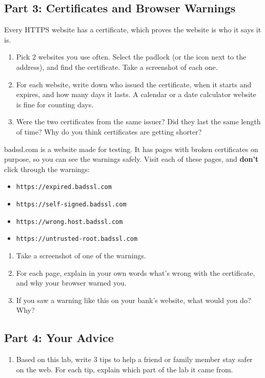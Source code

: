 \documentclass[12pt]{article}
\begin{document}
\subsection*{Part 3: Certificates and Browser Warnings}
Every HTTPS website has a certificate, which proves the website is who it says it is.
\begin{enumerate}[start=10]
    \item Pick 2 websites you use often. Select the padlock (or the icon next to the address), and find the certificate. Take a screenshot of each one.
    \item For each website, write down who issued the certificate, when it starts and expires, and how many days it lasts. A calendar or a date calculator website is fine for counting days.
    \item Were the two certificates from the same issuer? Did they last the same length of time? Why do you think certificates are getting shorter?
\end{enumerate}
badssl.com is a website made for testing. It has pages with broken certificates on purpose, so you can see the warnings safely. Visit each of these pages, and \textbf{don't} click through the warnings:
\begin{itemize}
    \item \nolinkurl{https://expired.badssl.com}
    \item \nolinkurl{https://self-signed.badssl.com}
    \item \nolinkurl{https://wrong.host.badssl.com}
    \item \nolinkurl{https://untrusted-root.badssl.com}
\end{itemize}
\begin{enumerate}[start=13]
    \item Take a screenshot of one of the warnings.
    \item For each page, explain in your own words what's wrong with the certificate, and why your browser warned you.
    \item If you saw a warning like this on your bank's website, what would you do? Why?
\end{enumerate}

\subsection*{Part 4: Your Advice}
\begin{enumerate}[start=16]
    \item Based on this lab, write 3 tips to help a friend or family member stay safer on the web. For each tip, explain which part of the lab it came from.
\end{enumerate}
\end{document}
